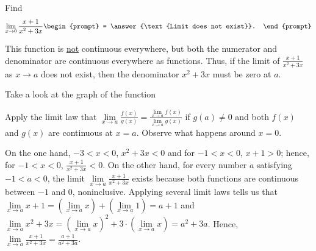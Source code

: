 \documentclass{ximera}
\author{Gregory Hartman \and Matthew Carr}
\begin{document}
\begin{exercise}



  Find 
  \[
  \displaystyle \lim_{x\to0} \frac{x+1}{x^2+3x}
  \begin{prompt}
  = \answer{\text{Limit does not exist}}.
  \end{prompt}
  \]
    \begin{hint}
      This function is \underline{not} continuous everywhere, but both the numerator and denominator are continuous everywhere as functions. Thus, if the limit of $\frac{x+1}{x^2+3x}$ as $x\to a$ does not exist, then the denominator $x^2+3x$ must be zero at $a$.
    \end{hint}
     \begin{hint}
    Take a look at the graph of the function
    \begin{center}
      \end{center}
     Apply the limit law that $\lim\limits_{x\to{a}}\frac{f(x)}{g(x)}=\frac{\lim\limits_{x\to a}f(x)}{\lim\limits_{x\to{a}}g(x)}$ if $g(a)\ne0$ and both $f(x)$ and $g(x)$ are continuous at $x=a$. Observe what happens around $x=0$.
    \end{hint}
    \begin{hint}
     On the one hand, $-3< x<0$, $x^2+3x<0$ and for $-1<x<0$, $x+1>0$; hence, for $-1<x<0$, $\frac{x+1}{x^2+3x}<0$. On the other hand, for every number $a$ satisfying $-1<a<0$, the limit  $\lim\limits_{x\to a}\frac{x+1}{x^2+3x}$ exists because both functions are continuous between $-1$ and $0$, noninclusive. Applying several limit laws tells us that $\lim\limits_{x\to a}x+1=\left(\lim\limits_{x\to a}x\right)+\left(\lim\limits_{x\to a}1\right)=a+1$ and $\lim\limits_{x\to a}x^2+3x=\left(\lim\limits_{x\to a}x\right)^2+3\cdot\left(\lim\limits_{x\to a}x\right)=a^2+3a$. Hence, $\lim\limits_{x\to a}\frac{x+1}{x^2+3x}=\frac{a+1}{a^2+3a}$.
     

\end{hint}
\end{exercise}
\end{document}
